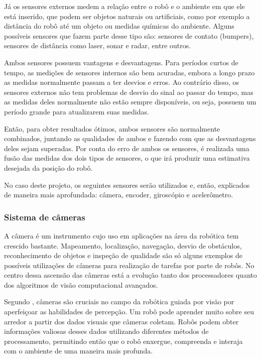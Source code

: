 \documentclass[acronym, symbols, table]{fei}
\begin{document}
			Já os sensores externos medem a relação entre o robô e o ambiente em que ele está inserido, que podem ser objetos naturais ou artificiais, como por exemplo a distância do robô até um objeto ou medidas químicas do ambiente. Alguns possíveis sensores que fazem parte desse tipo são: sensores de contato (bumpers), sensores de distância como laser, sonar e radar, entre outros.
			
			Ambos sensores possuem vantagens e desvantagens. Para períodos curtos de tempo, as medições de sensores internos são bem acuradas, embora a longo prazo as medidas normalmente passam a ter desvios e erros. Ao contrário disso, os sensores externos não tem problemas de desvio do sinal ao passar do tempo, mas as medidas deles normalmente não estão sempre disponíveis, ou seja, possuem um período grande para atualizarem suas medidas.
			
			Então, para obter resultados ótimos, ambos sensores são normalmente combinados, juntando as qualidades de ambos e fazendo com que as desvantagens deles sejam superadas. Por conta do erro de ambos os sensores, é realizada uma fusão das medidas dos dois tipos de sensores, o que irá produzir uma estimativa desejada da posição do robô.
			
			No caso deste projeto, os seguintes sensores serão utilizados e, então, explicados de maneira mais aprofundada: câmera, encoder, giroscópio e acelerômetro.
			
			\subsubsection{Sistema de câmeras}
			
				A câmera é um instrumento cujo uso em aplicações na área da robótica tem crescido bastante. Mapeamento, localização, navegação, desvio de obstáculos, reconhecimento de objetos e inspeção de qualidade são só alguns exemplos de possíveis utilizações de câmeras para realização de tarefas por parte de robôs. No centro dessa ascensão das câmeras está a evolução tanto dos processadores quanto dos algoritmos de visão computacional avançados.
				
				Segundo \textcite{cameras_technexion}, câmeras são cruciais no campo da robótica guiada por visão por aperfeiçoar as habilidades de percepção. Um robô pode aprender muito sobre seu arredor a partir dos dados visuais que câmeras coletam. Robôs podem obter informações valiosas desses dados utilizando diferentes métodos de processamento, permitindo então que o robô enxergue, compreenda e interaja com o ambiente de uma maneira mais profunda.
				
\end{document}
